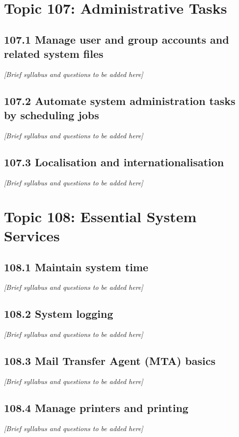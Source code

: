 \documentclass[12pt,a4paper]{report}
\begin{document}
\chapter{Topic 107: Administrative Tasks}
\section{107.1 Manage user and group accounts and related system files}
\textit{[Brief syllabus and questions to be added here]}

\section{107.2 Automate system administration tasks by scheduling jobs}
\textit{[Brief syllabus and questions to be added here]}

\section{107.3 Localisation and internationalisation}
\textit{[Brief syllabus and questions to be added here]}

\chapter{Topic 108: Essential System Services}
\section{108.1 Maintain system time}
\textit{[Brief syllabus and questions to be added here]}

\section{108.2 System logging}
\textit{[Brief syllabus and questions to be added here]}

\section{108.3 Mail Transfer Agent (MTA) basics}
\textit{[Brief syllabus and questions to be added here]}

\section{108.4 Manage printers and printing}
\textit{[Brief syllabus and questions to be added here]}
\end{document}
